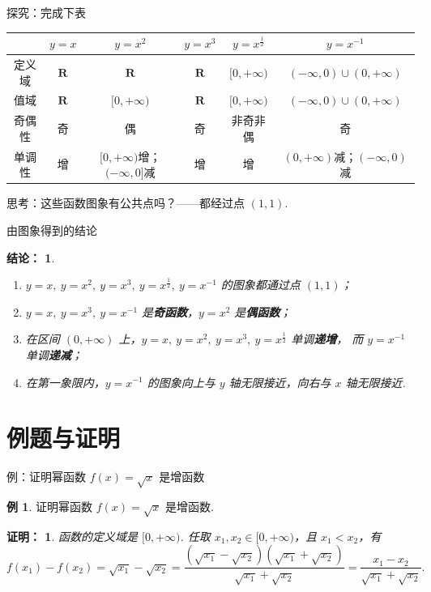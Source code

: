 \documentclass[aspectratio=169,13pt,t] {beamer}
\newtheorem{peroration}{结论：}
\newtheorem*{prooft}{证明：}
\theoremstyle{definition}
\newtheorem{exam}{例}
\begin{document}
\begin{frame}{探究：完成下表}
	\begin{center}
	\renewcommand{\arraystretch}{1.5}
	\begin{tabular}{|c|c|c|c|c|c|}
		\hline
		& $y=x$ & $y=x^{2}$ & $y=x^{3}$ & $y=x^{\frac12}$ & $y=x^{-1}$ \\ \hline
		定义域 & $\mathbf{R}$ & $\mathbf{R}$ & $\mathbf{R}$ & $[0,+\infty)$ & $(-\infty,0)\cup(0,+\infty)$ \\ \hline
		值域 & $\mathbf{R}$ & $[0,+\infty)$ & $\mathbf{R}$ & $[0,+\infty)$ & $(-\infty,0)\cup(0,+\infty)$ \\ \hline
		奇偶性 & 奇 & 偶 & 奇 & 非奇非偶 & 奇 \\ \hline
		单调性 & 增 & $[0,+\infty)$增；$(-\infty,0]$减 & 增 & 增 & $(0,+\infty)$减；$(-\infty,0)$减 \\ \hline
	\end{tabular}
	\end{center}
	\vspace{0.8em}
	\begin{summarybox-answer}
		思考：这些函数图象有公共点吗？——都经过点 $(1,1)$.
	\end{summarybox-answer}
\end{frame}

\begin{frame}{由图象得到的结论}
	\begin{peroration}
	\begin{enumerate}[(1)]
		\item $y=x,\ y=x^{2},\ y=x^{3},\ y=x^{\frac12},\ y=x^{-1}$ 的图象都通过点 \textbf{$(1,1)$}；
		\item $y=x,\ y=x^{3},\ y=x^{-1}$ 是\textbf{奇函数}，$y=x^{2}$ 是\textbf{偶函数}；
		\item 在区间 $(0,+\infty)$ 上，$y=x,\ y=x^{2},\ y=x^{3},\ y=x^{\frac12}$ 单调\textbf{递增}，
		      而 $y=x^{-1}$ 单调\textbf{递减}；
		\item 在第一象限内，$y=x^{-1}$ 的图象向上与 $y$ 轴无限接近，向右与 $x$ 轴无限接近.
	\end{enumerate}
	\end{peroration}
\end{frame}

\section{例题与证明}

\begin{frame}{例：证明幂函数 $f(x)=\sqrt{x}$ 是增函数}
	\begin{exam}
		证明幂函数 $f(x)=\sqrt{x}$ 是增函数.
	\end{exam}
	\pause
	\begin{prooft}
		函数的定义域是 $[0,+\infty)$. 任取 $x_{1},x_{2}\in[0,+\infty)$，且 $x_{1}<x_{2}$，有
		\[
			f(x_{1})-f(x_{2})=\sqrt{x_{1}}-\sqrt{x_{2}}
			=\frac{(\sqrt{x_{1}}-\sqrt{x_{2}})(\sqrt{x_{1}}+\sqrt{x_{2}})}{\sqrt{x_{1}}+\sqrt{x_{2}}}
			=\frac{x_{1}-x_{2}}{\sqrt{x_{1}}+\sqrt{x_{2}}}.
		\]
	\end{prooft}
\end{frame}
\end{document}
